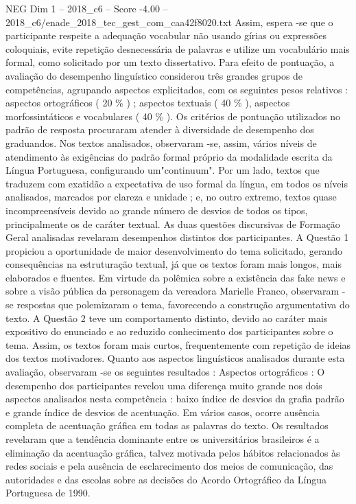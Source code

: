 \begin{textsample}{NEG Dim 1 – 2018\_c6 – Score -4.00 – 2018\_c6/enade\_2018\_tec\_gest\_com\_caa42f8020.txt}
Assim, espera -se que o participante respeite a adequação vocabular não usando gírias ou expressões coloquiais, evite repetição desnecessária de palavras e utilize um vocabulário mais formal, como solicitado por um texto dissertativo.
Para efeito de pontuação, a avaliação do desempenho linguístico considerou três grandes grupos de competências, agrupando aspectos explicitados, com os seguintes pesos relativos : aspectos ortográficos ( 20 \% ) ; aspectos textuais ( 40 \% ), aspectos morfossintáticos e vocabulares ( 40 \% ).
Os critérios de pontuação utilizados no padrão de resposta procuraram atender à diversidade de desempenho dos graduandos.
Nos textos analisados, observaram -se, assim, vários níveis de atendimento às exigências do padrão formal próprio da modalidade escrita da Língua Portuguesa, configurando um"continuum".
Por um lado, textos que traduzem com exatidão a expectativa de uso formal da língua, em todos os níveis analisados, marcados por clareza e unidade ; e, no outro extremo, textos quase incompreensíveis devido ao grande número de desvios de todos os tipos, principalmente os de caráter textual.
As duas questões discursivas de Formação Geral analisadas revelaram desempenhos distintos dos participantes.
A Questão 1 propiciou a oportunidade de maior desenvolvimento do tema solicitado, gerando consequências na estruturação textual, já que os textos foram mais longos, mais elaborados e fluentes.
Em virtude da polêmica sobre a existência das fake news e sobre a visão pública da personagem da vereadora Marielle Franco, observaram -se respostas que polemizaram o tema, favorecendo a construção argumentativa do texto.
A Questão 2 teve um comportamento distinto, devido ao caráter mais expositivo do enunciado e ao reduzido conhecimento dos participantes sobre o tema.
Assim, os textos foram mais curtos, frequentemente com repetição de ideias dos textos motivadores.
Quanto aos aspectos linguísticos analisados durante esta avaliação, observaram -se os seguintes resultados : Aspectos ortográficos : O desempenho dos participantes revelou uma diferença muito grande nos dois aspectos analisados nesta competência : baixo índice de desvios da grafia padrão e grande índice de desvios de acentuação.
Em vários casos, ocorre ausência completa de acentuação gráfica em todas as palavras do texto.
Os resultados revelaram que a tendência dominante entre os universitários brasileiros é a eliminação da acentuação gráfica, talvez motivada pelos hábitos relacionados às redes sociais e pela ausência de esclarecimento dos meios de comunicação, das autoridades e das escolas sobre as decisões do Acordo Ortográfico da Língua Portuguesa de 1990.

\end{textsample}
